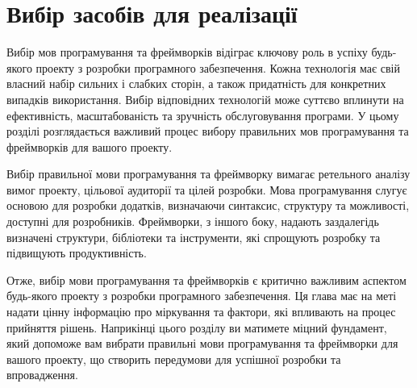 \chapter{Вибір засобів для реалізації}
\label{chap:implementation-methods}

Вибір мов програмування та фреймворків відіграє ключову роль в успіху будь-якого проекту з розробки програмного забезпечення. Кожна технологія має свій власний набір сильних і слабких сторін, а також придатність для конкретних випадків використання. Вибір відповідних технологій може суттєво вплинути на ефективність, масштабованість та зручність обслуговування програми. У цьому розділі розглядається важливий процес вибору правильних мов програмування та фреймворків для вашого проекту.

Вибір правильної мови програмування та фреймворку вимагає ретельного аналізу вимог проекту, цільової аудиторії та цілей розробки. Мова програмування слугує основою для розробки додатків, визначаючи синтаксис, структуру та можливості, доступні для розробників. Фреймворки, з іншого боку, надають заздалегідь визначені структури, бібліотеки та інструменти, які спрощують розробку та підвищують продуктивність.

Отже, вибір мови програмування та фреймворків є критично важливим аспектом будь-якого проекту з розробки програмного забезпечення. Ця глава має на меті надати цінну інформацію про міркування та фактори, які впливають на процес прийняття рішень. Наприкінці цього розділу ви матимете міцний фундамент, який допоможе вам вибрати правильні мови програмування та фреймворки для вашого проекту, що створить передумови для успішної розробки та впровадження.







